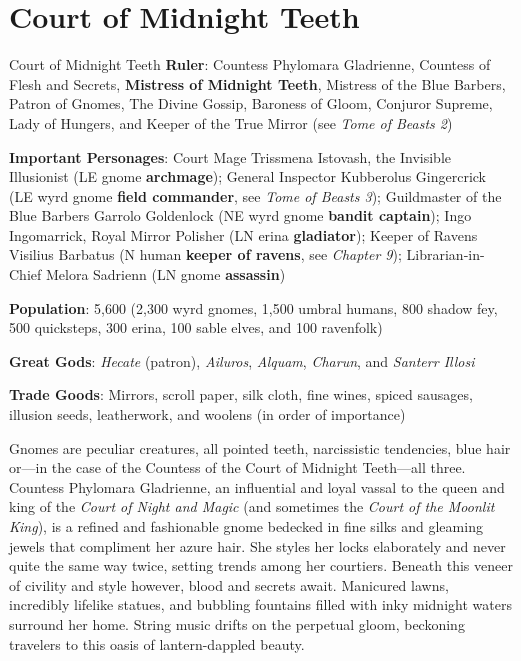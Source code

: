 \documentclass[10pt,a4paper,twoside,bg=print,twocolumn,openany,nodeprecatedcode]{dndbook}
\begin{document}
\section{Court of Midnight Teeth}
\begin{DndSidebar}[float=!b]{Court of Midnight Teeth}
\textbf{Ruler}: Countess Phylomara Gladrienne, Countess of Flesh and Secrets, \textbf{Mistress of Midnight Teeth}, Mistress of the Blue Barbers, Patron of Gnomes, The Divine Gossip, Baroness of Gloom, Conjuror Supreme, Lady of Hungers, and Keeper of the True Mirror (see \textit{Tome of Beasts 2})



\textbf{Important Personages}: Court Mage Trissmena Istovash, the Invisible Illusionist (LE gnome \textbf{archmage}); General Inspector Kubberolus Gingercrick (LE wyrd gnome \textbf{field commander}, see \textit{Tome of Beasts 3}); Guildmaster of the Blue Barbers Garrolo Goldenlock (NE wyrd gnome \textbf{bandit captain}); Ingo Ingomarrick, Royal Mirror Polisher (LN erina \textbf{gladiator}); Keeper of Ravens Visilius Barbatus (N human \textbf{keeper of ravens}, see \textit{Chapter 9}); Librarian‑in-Chief Melora Sadrienn (LN gnome \textbf{assassin})



\textbf{Population}: 5,600 (2,300 wyrd gnomes, 1,500 umbral humans, 800 shadow fey, 500 quicksteps, 300 erina, 100 sable elves, and 100 ravenfolk)



\textbf{Great Gods}: \textit{Hecate} (patron), \textit{Ailuros}, \textit{Alquam}, \textit{Charun}, and \textit{Santerr Illosi}



\textbf{Trade Goods}: Mirrors, scroll paper, silk cloth, fine wines, spiced sausages, illusion seeds, leatherwork, and woolens (in order of importance)





\end{DndSidebar}

Gnomes are peculiar creatures, all pointed teeth, narcissistic tendencies, blue hair or—in the case of the Countess of the Court of Midnight Teeth—all three. Countess Phylomara Gladrienne, an influential and loyal vassal to the queen and king of the \textit{Court of Night and Magic} (and sometimes the \textit{Court of the Moonlit King}), is a refined and fashionable gnome bedecked in fine silks and gleaming jewels that compliment her azure hair. She styles her locks elaborately and never quite the same way twice, setting trends among her courtiers. Beneath this veneer of civility and style however, blood and secrets await. Manicured lawns, incredibly lifelike statues, and bubbling fountains filled with inky midnight waters surround her home. String music drifts on the perpetual gloom, beckoning travelers to this oasis of lantern-dappled beauty.
\end{document}
